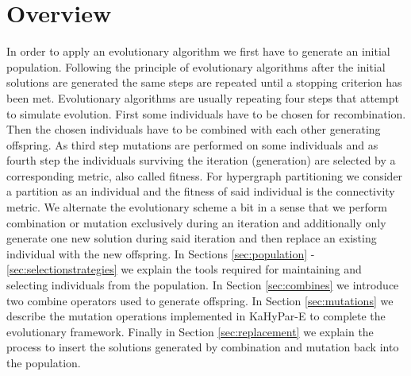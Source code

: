 \documentclass[a4paper,12pt,titlepage, BCOR7mm,headsepline]{scrbook}
\numberwithin{equation}{section}
\begin{document}
\section{Overview}
In order to apply an evolutionary algorithm we first have to generate an initial population. 
Following the principle of evolutionary algorithms after the initial solutions are generated  the same steps are repeated until a stopping criterion has been met.
Evolutionary algorithms are usually repeating four steps that attempt to simulate evolution. First some individuals have to be chosen for recombination. Then the chosen individuals have to be combined with each other generating offspring. As third step mutations are performed on some individuals and as fourth step the individuals surviving the iteration (generation) are selected by a corresponding metric, also called fitness. For hypergraph partitioning we consider a partition as an individual and the fitness of said individual is the connectivity metric. We alternate the evolutionary scheme a bit in a sense that we perform combination or mutation exclusively during an iteration and additionally only generate one new solution during said iteration and then replace an existing individual with the new offspring. 
In Sections \ref{sec:population} - \ref{sec:selectionstrategies} we explain the tools required for maintaining and selecting individuals from the population. %
In Section \ref{sec:combines} we introduce two combine operators used to generate offspring. In Section \ref{sec:mutations} we describe the mutation operations implemented in KaHyPar-E to complete the evolutionary framework. Finally in Section \ref{sec:replacement} we explain the process to insert the solutions generated by combination and mutation back into the population.
\end{document}
